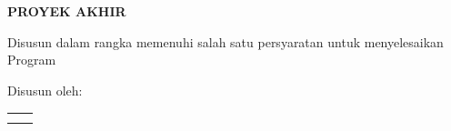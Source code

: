 
\begin{titlepage}
    \begin{center}      
        \bo{\Judul} \\[0.75cm]
        
        \textit{\bo{\JudulInggris}} \\[1.0cm]

        \vspace*{1 cm}    
        \textbf{PROYEK AKHIR}
        
        \vspace*{1 cm}
        
		Disusun dalam rangka memenuhi salah satu persyaratan untuk menyelesaikan\\
		Program \program

        \vspace*{1 cm}       
        Disusun oleh:\\
           \vspace*{.5 cm} 
 \begin{tabular}{ll}
	\penulistu 	& \nimtu \\
	\penulisdu 	& \nimdu \\
\end{tabular}


        \vspace*{1.0cm}
        

\end{center}
\end{titlepage}
